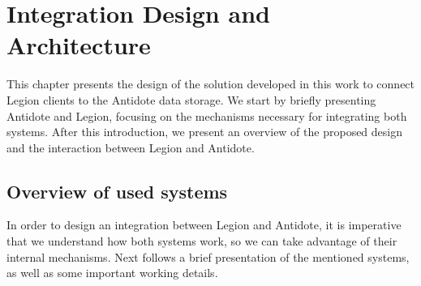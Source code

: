 \chapter{Integration Design and Architecture}
\label{cha:integration_design_and_architecture}

This chapter presents the design of the solution developed in this work to connect Legion clients to the Antidote data storage. We start by briefly presenting Antidote and Legion, focusing on the mechanisms necessary for integrating both systems. After this introduction, we present an overview of the proposed design and the interaction between Legion and Antidote.

\section{Overview of used systems}
\label{sec:system_introduction}
In order to design an integration between Legion and Antidote, it is imperative that we understand how both systems work, so we can take advantage of their internal mechanisms. Next follows a brief presentation of the mentioned systems, as well as some important working details.

